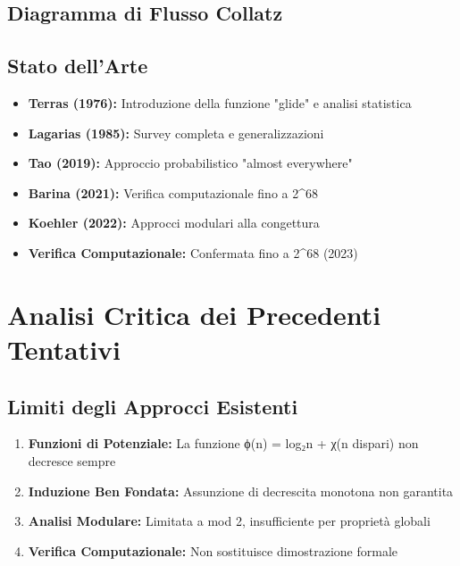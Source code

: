 \documentclass[11pt,a4paper]{article}
\begin{document}
\subsection{Diagramma di Flusso Collatz}

\begin{center}
\end{center}

\subsection{Stato dell'Arte}

\begin{itemize}
\item \textbf{Terras (1976):} Introduzione della funzione "glide" e analisi statistica
\item \textbf{Lagarias (1985):} Survey completa e generalizzazioni
\item \textbf{Tao (2019):} Approccio probabilistico "almost everywhere"
\item \textbf{Barina (2021):} Verifica computazionale fino a 2^{68}
\item \textbf{Koehler (2022):} Approcci modulari alla congettura
\item \textbf{Verifica Computazionale:} Confermata fino a 2^{68} (2023)
\end{itemize}

\section{Analisi Critica dei Precedenti Tentativi}

\subsection{Limiti degli Approcci Esistenti}

\begin{enumerate}
\item \textbf{Funzioni di Potenziale:} La funzione ϕ(n) = log₂n + χ(n dispari) non decresce sempre
\item \textbf{Induzione Ben Fondata:} Assunzione di decrescita monotona non garantita
\item \textbf{Analisi Modulare:} Limitata a mod 2, insufficiente per proprietà globali
\item \textbf{Verifica Computazionale:} Non sostituisce dimostrazione formale
\end{enumerate}
\end{document}
